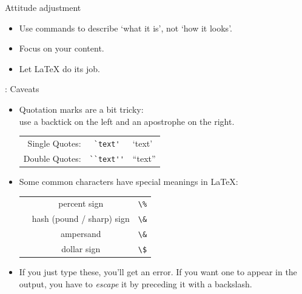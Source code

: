 \documentclass[aspectratio=169]{beamer}
\begin{document}
\begin{frame}[fragile]{Attitude adjustment}

    \begin{itemize}
        \item Use commands to describe `what it is', not `how it looks'.
        \item Focus on your content.
        \item Let \LaTeX{} do its job.
    \end{itemize}
\end{frame}


\begin{frame}[fragile]{\insertsubsection{}: Caveats}
    \small
    \begin{itemize}
        \item Quotation marks are a bit tricky:\\
              use a backtick \keystroke{\`{}} on the left and an apostrophe \keystroke{\'{}} on the right.
              \begin{tabular}{rcl}
                  Single Quotes: & \verb|`text'|   & `text'   \\
                  Double Quotes: & \verb|``text''| & ``text''
              \end{tabular}

        \item Some common characters have special meanings in \LaTeX:
              \\[1ex]
              \begin{tabular}{rcl}
                  \keystrokebftt{\%} & percent sign              & \verb|\%| \\
                  \keystrokebftt{\#} & hash (pound / sharp) sign & \verb|\&| \\
                  \keystrokebftt{\&} & ampersand                 & \verb|\&| \\
                  \keystrokebftt{\$} & dollar sign               & \verb|\$|
              \end{tabular}
        \item If you just type these, you'll get an error. If you want one to appear in the output, you have to \emph{escape} it by preceding it with a backslash.
    \end{itemize}
\end{frame}
\end{document}
